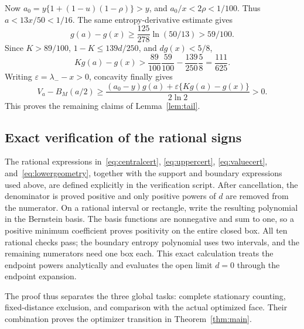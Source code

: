 \documentclass[12pt,letterpaper,onecolumn]{article}
\theoremstyle{definition}
\begin{document}
Now \(a_0=y\{1+(1-u)(1-\rho)\}>y\), and
\(a_0/x<2\rho<1/100\). Thus \(a<13x/50<1/16\).
The same entropy-derivative estimate gives
\[
g(a)-g(x)\ge\frac{125}{278}\ln(50/13)>59/100.
\]
Since \(K>89/100\), \(1-K\le139d/250\), and \(dg(x)<5/8\),
\[
Kg(a)-g(x)>\frac{89}{100}\frac{59}{100}
-\frac{139}{250}\frac58=\frac{111}{625}.
\]
Writing \(\varepsilon=\lambda_--x>0\), concavity finally gives
\[
V_a-B_M(a/2)\ge
\frac{(a_0-y)g(a)+\varepsilon\{Kg(a)-g(x)\}}{2\ln2}>0.
\]
This proves the remaining claims of Lemma~\ref{lem:tail}.

\subsection{Exact verification of the rational signs}
The rational expressions in~\eqref{eq:centralcert}, \eqref{eq:uppercert}, \eqref{eq:valuecert}, and~\eqref{eq:lowergeometry}, together with the support and boundary expressions used above, are defined explicitly in the verification script.
After cancellation, the denominator is proved positive and only positive powers of \(d\) are removed from the numerator.
On a rational interval or rectangle, write the resulting polynomial in the Bernstein basis. The basis functions are nonnegative and sum to one, so a positive minimum coefficient proves positivity on the entire closed box.
All ten rational checks pass; the boundary entropy polynomial uses two intervals, and the remaining numerators need one box each.
This exact calculation treats the endpoint powers analytically and evaluates the open limit \(d=0\) through the endpoint expansion.

The proof thus separates the three global tasks: complete stationary counting, fixed-distance exclusion, and comparison with the actual optimized face. Their combination proves the optimizer transition in Theorem~\ref{thm:main}.
\end{document}
